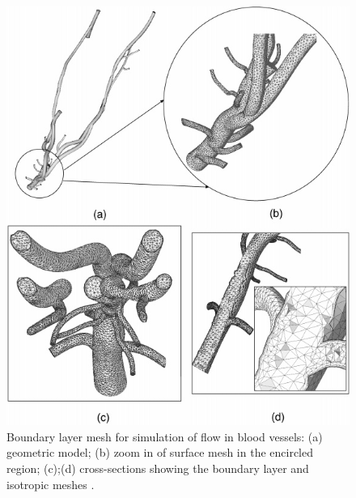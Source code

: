 \begin{figure}
\begin{minipage}{0.45\linewidth}
	\centering
	\includegraphics[width=\linewidth]{img/intro/lit/shephard.png}
	\caption[Boundary layer mesh for simulation of flow in blood vessels\cite{garimella2000boundary}]{Boundary layer mesh for simulation of flow in blood vessels: (a) geometric model; (b) zoom in of surface mesh in the encircled region; (c);(d) cross-sections showing the boundary layer and isotropic meshes \cite{garimella2000boundary}.}
	\label{fig-shephard}
\end{minipage}\hfill
\begin{minipage}{0.45\linewidth}
	\centering

\end{minipage}
\end{figure}
